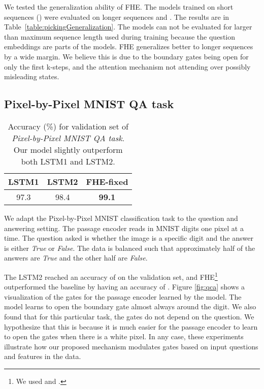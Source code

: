 We tested the generalization ability of FHE. The models trained on short sequences (\mbox{}) were evaluated on longer sequences and \mbox{}. The results are in Table~\ref{table:pickingGeneralization}. The models can not be evaluated for  larger than maximum sequence length used during training because the question embeddings are parts of the models. FHE generalizes better to longer sequences by a wide margin. We believe this is due to the boundary gates being open for only the first k-steps, and the attention mechanism not attending over possibly misleading states.

\subsection{Pixel-by-Pixel MNIST QA task}

\begin{table}[t!]
\vskip -0.1in
\caption{Accuracy (\%) for validation set of \emph{Pixel-by-Pixel MNIST QA task}. Our model slightly outperform both LSTM1 and LSTM2.}
\label{table:mnist}
\vskip 0.1in
\begin{center}
\begin{small}
\begin{sc}
\begin{tabular}{c c | c}
 \toprule
 \textbf{LSTM1} &  \textbf{LSTM2} & \textbf{FHE-fixed}\\
 \midrule
 97.3 & 98.4 &  \textbf{99.1}\\
 \bottomrule
\end{tabular}
\end{sc}
\end{small}
\end{center}
\vskip -0.25in
\end{table}

We adapt the Pixel-by-Pixel MNIST classification task \cite{lecun1998gradient,DBLP:journals/corr/LeJH15} to the question and answering setting. The passage encoder reads in MNIST digits one pixel at a time. The question asked is whether the image is a specific digit and the answer is either \emph{True} or \emph{False}. The data is balanced such that approximately half of the answers are \emph{True} and the other half are \emph{False}.

The LSTM2 reached an accuracy of  on the validation set, and FHE\footnote{We used  and .} outperformed the baseline by having an accuracy of . Figure \ref{fig:qca} shows a visualization of the gates for the passage encoder learned by the model. The model learns to open the boundary gate almost always around the digit. We also found that for this particular task, the gates do not depend on the question. We hypothesize that this is because it is much easier for the passage encoder to learn to open the gates when there is a white pixel. In any case, these experiments illustrate how our proposed mechanism  modulates gates based on input questions and features in the data.